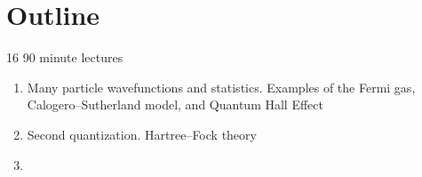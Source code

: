 
\section{Outline}

16 90 minute lectures

\begin{enumerate}
\item Many particle wavefunctions and statistics. Examples of the Fermi gas, Calogero--Sutherland model, and Quantum Hall Effect

\item Second quantization. Hartree--Fock theory

\item 
\end{enumerate}